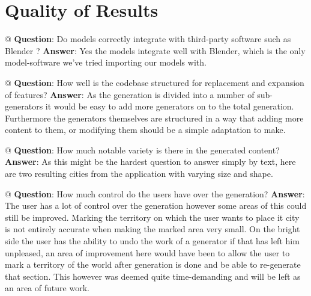 \section{Quality of Results}
\begin{easylist}
  @ \textbf{Question}: Do models correctly integrate with third-party software such as Blender \cite{blender}? \newline
  	\textbf{Answer}: Yes the models integrate well with Blender, which is the only model-software we've tried importing our models with. %
	 
  @ \textbf{Question}: How well is the codebase structured for replacement and expansion of features? \newline
  	\textbf{Answer}: As the generation is divided into a number of sub-generators it would be easy to add more generators on to the total generation.
	Furthermore the generators themselves are structured in a way that adding more content to them, or modifying them should be a simple adaptation to make. 
	
  @ \textbf{Question}: How much notable variety is there in the generated content? \newline
  	\textbf{Answer}: As this might be the hardest question to answer simply by text, here are two resulting cities from the application with varying size and shape.  %
	
  @ \textbf{Question}: How much control do the users have over the generation? \newline
  	\textbf{Answer}: The user has a lot of control over the generation however some areas of this could still be improved. 
	Marking the territory on which the user wants to place it city is not entirely accurate when making the marked area very small. 
	On the bright side the user has the ability to undo the work of a generator if that has left him unpleased, an area of improvement here would have been to allow the user to mark a territory of the world after generation is done and 	be able to re-generate that section. This however was deemed quite time-demanding and will be left as an area of future work. 
	

\end{easylist}
